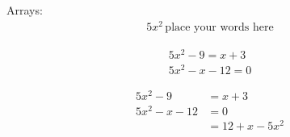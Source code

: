 \documentclass[11pt]{article}
\begin{document}
Arrays:
\begin{align}
    5x^2\, \text{place your words here} %
\end{align}

\begin{align}
    5x^2-9=x+3 \\
    5x^2-x-12=0
\end{align}

\begin{align*}  %
    5x^2-9    & =x+3       \\
    5x^2-x-12 & =0         \\
              & =12+x-5x^2
\end{align*}
\end{document}
